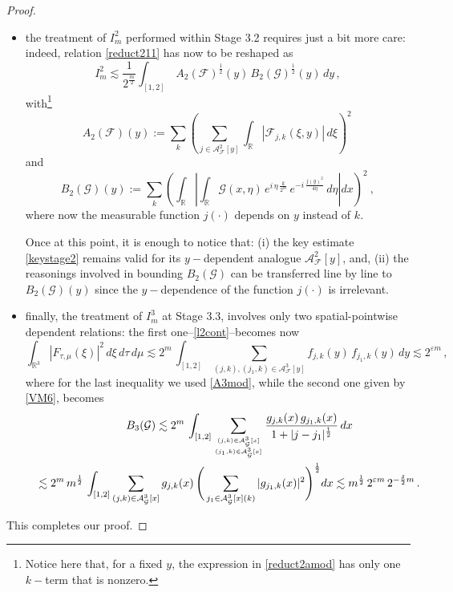 \documentclass[a4paper,reqno]{amsart}
\numberwithin{equation}{section}
\theoremstyle{definition}
\newcommand{\R}{\mathbb{R}}
\def\F{\mathcal{F}}
\def\G{\mathcal{G}}
\def\v{\varepsilon}
\def\A{\mathcal{A}}
\def\d{\delta}
\begin{document}
\begin{proof}
\begin{itemize}
\item the treatment of $I_m^2$ performed within Stage 3.2 requires just a bit more care: indeed, relation \eqref{reduct211} has now to be reshaped as
\begin{equation}\label{reduct211mod}
	I_m^2\lesssim \frac{1}{2^{\frac{m}{2}}} \int_{[1,2]}\,A_2(\F)^{\frac{1}{2}}(y)\,B_2(\G)^{\frac{1}{2}}(y)\,dy\,,
\end{equation}
with\footnote{Notice here that, for a fixed $y$, the expression in \eqref{reduct2amod} has only one $k-$term that is nonzero.}
\begin{equation}\label{reduct2amod}
A_2(\F)(y):=\sum_k \left(\sum_{j\in \A_{\F}^{2}[y]}\int_{\R} \left|\F_{j,k}(\xi,y)\right| \,d\xi\right)^2\,
\end{equation}
and
\begin{equation}\label{reduct2bmod}
B_2(\G)(y):=\sum_k \left(\int_{\R}\left|\int_{\R}\G(x,\eta)\,e^{i\,\eta\,\frac{k}{2^m}}\,e^{-i\,\frac{j(y)^2}{4 \eta}}\,d\eta\right| dx \right)^2\:,
\end{equation}
where now the measurable function $j(\cdot)$ depends on $y$ instead of $k$.

Once at this point, it is enough to notice that: (i) the key estimate \eqref{keystage2} remains valid for its $y-$dependent analogue $\A_{\F}^{2}[y]$, and, (ii) the reasonings involved in bounding $B_2(\G)$ can be transferred line by line to $B_2(\G)(y)$ since the $y-$dependence of the function $j(\cdot)$ is irrelevant.

\item finally, the treatment of $I_m^3$ at Stage 3.3, involves only two spatial-pointwise dependent relations: the first one--\eqref{l2cont}--becomes now
\begin{equation}\label{l2contmodif}
	\int_{\R^3} |F_{\tau,\mu}(\xi)|^2\,d\xi\,d\tau\,d\mu\lesssim 2^{m}\,\int_{[1,2]}\sum_{(j,k),(j_1,k)\in\A_{\F}^{3}[y]} f_{j,k}(y)\,f_{j_1,k}(y)\,dy\lesssim 2^{\v m}\,,
\end{equation}
where for the last inequality we used \eqref{A3mod}, while the second one given by \eqref{VM6}, becomes
\begin{align}\label{VM6mod}
	B_3(\G)\lesssim2^{m}\,\int_{[1,2]}\sum_{{(j,k)\in\A_{\G}^{3}[x]}\atop{(j_1,k)\in\A_{\G}^{3}[x]}} \frac{g_{j,k}(x)\,g_{j_1,k}(x)}{1+|j-j_1|^{\frac{1}{2}}}\,dx \qquad\qquad\qquad\nonumber\\
\:\:\:\:\:\lesssim 2^{m}\,m^{\frac{1}{2}}\,\int_{[1,2]}\sum_{(j,k)\in\A_{\G}^{3}[x]} g_{j,k}(x)\,
	\Bigg(\sum_{j_1\in\A_{\G}^{3}[x](k)} |g_{j_1,k}(x)|^2\Bigg)^{\frac{1}{2}}dx\lesssim
m^{\frac{1}{2}}\,2^{\v m}\,2^{-\frac{\d}{2}m}\,.
\end{align}
\end{itemize}




This completes our proof.

\end{proof}
\end{document}
